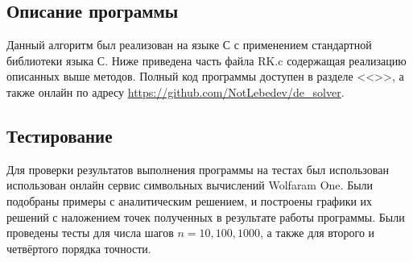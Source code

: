 \documentclass[a4paper,12pt,titlepage,finall]{article}
\begin{document}
\subsection{Описание программы}
Данный алгоритм был реализован на языке С с применением стандартной библиотеки языка С. Ниже приведена часть файла RK.c содержащая реализацию описанных выше методов. Полный код программы доступен в разделе <<>>, а также онлайн по адресу \url{https://github.com/NotLebedev/de_solver}.


\subsection{Тестирование}
Для проверки результатов выполнения программы на тестах был использован использован онлайн сервис символьных вычислений Wolfaram One. Были подобраны примеры с аналитическим решением, и построены графики их решений с наложением точек полученных в результате работы программы. Были проведены тесты для числа шагов $n = 10, 100, 1000$, а также для второго и четвёртого порядка точности.
\end{document}
